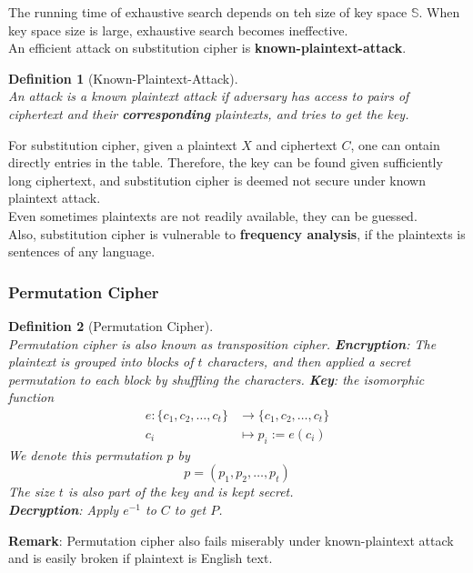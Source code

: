 \documentclass[12pt]{article}
\newtheorem{definition}{Definition}[section]
\theoremstyle{definition}
\begin{document}
The running time of exhaustive search depends on teh size of key space $\mathbb{S}$. When key space size is large, exhaustive search becomes ineffective.\\
An efficient attack on substitution cipher is \textbf{known-plaintext-attack}.\\
\begin{definition}[Known-Plaintext-Attack]
\hfill\\\normalfont An attack is a known plaintext attack if adversary has access to pairs of ciphertext and their \textbf{corresponding} plaintexts, and tries to get the key.
\end{definition}
For substitution cipher, given a plaintext $X$ and ciphertext $C$, one can ontain directly entries in the table. Therefore, the key can be found given sufficiently long ciphertext, and substitution cipher is deemed not secure under known plaintext attack.\\
Even sometimes plaintexts are not readily available, they can be guessed.\\
Also, substitution cipher is vulnerable to \textbf{frequency analysis}, if the plaintexts is sentences of any language.
\subsubsection{Permutation Cipher}
\begin{definition}[Permutation Cipher]
\hfill\\\normalfont Permutation cipher is also known as transposition cipher.
\textbf{Encryption}: The plaintext is grouped into blocks of $t$ characters, and then applied a secret permutation to each block by shuffling the characters.
\textbf{Key}: the isomorphic function \begin{align*}
e:\{c_1,c_2,\ldots, c_t\}&\to\{c_1,c_2,\ldots, c_t\}\\
c_i&\mapsto p_i:=e(c_i)
\end{align*} 
We denote this permutation $p$ by
\[
p=(p_1,p_2,\ldots, p_t)
\]
The size $t$ is also part of the key and is kept secret. \\
\textbf{Decryption}: Apply $e^{-1}$ to $C$ to get $P$. 
\end{definition}
\textbf{Remark}: Permutation cipher also fails miserably under known-plaintext attack and is easily broken if plaintext is English text.
\end{document}
